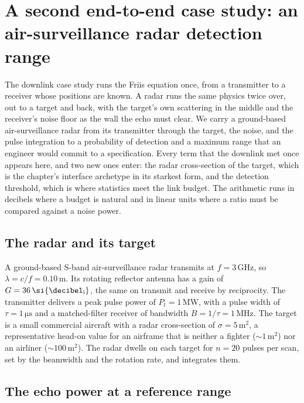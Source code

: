 \section{A second end-to-end case study: an air-surveillance radar
detection range}

The downlink case study runs the Friis equation once, from a transmitter
to a receiver whose positions are known. A radar runs the same physics
twice over, out to a target and back, with the target's own scattering in
the middle and the receiver's noise floor as the wall the echo must clear.
We carry a ground-based air-surveillance radar from its transmitter
through the target, the noise, and the pulse integration to a probability
of detection and a maximum range that an engineer would commit to a
specification. Every term that the downlink met once appears here, and two
new ones enter: the radar cross-section of the target, which is the
chapter's interface archetype in its starkest form, and the detection
threshold, which is where statistics meet the link budget. The arithmetic
runs in decibels where a budget is natural and in linear units where a
ratio must be compared against a noise power.

\subsection{The radar and its target}

A ground-based S-band air-surveillance radar transmits at $f = 3\,\si{
\giga\hertz}$, so $\lambda = c/f = 0.10\,\si{\meter}$. Its rotating
reflector antenna has a gain of $G = 36\,\si{\decibel\textsubscript{i}}$,
the same on transmit and receive by reciprocity. The transmitter delivers
a peak pulse power of $P_{t} = 1\,\si{\mega\watt}$, with a pulse width of
$\tau = 1\,\si{\micro\second}$ and a matched-filter receiver of bandwidth
$B = 1/\tau = 1\,\si{\mega\hertz}$. The target is a small commercial
aircraft with a radar cross-section of $\sigma = 5\,\si{\meter}^{2}$, a
representative head-on value for an airframe that is neither a fighter
($\sim 1\,\si{\meter}^{2}$) nor an airliner ($\sim 100\,\si{\meter}^{2}$).
The radar dwells on each target for $n = 20$ pulses per scan, set by the
beamwidth and the rotation rate, and integrates them.

\subsection{The echo power at a reference range}


